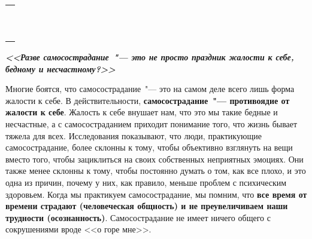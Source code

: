 \setlength{\extrarowheight}{2mm}
\begin{tabularx}{\textwidth}{X}
	\\
	\arrayrulecolor{gray}\hline\\
	\hline\\
	\hline\\
	\hline\\
	\hline\\
	\hline\\
	\hline\\
	\hline\\
	\hline\\
	\hline\\
	\hline\\	
\end{tabularx}
\setlength{\extrarowheight}{0mm}


\textbf{\textit{<<Разве самосострадание~"--- это не просто праздник жалости к себе, бедному и несчастному?>>}}

\vspace{2ex}

Многие боятся, что самосострадание~"--- это на самом деле всего лишь форма жалости к себе. В действительности,\textbf{ самосострадание~"--- противоядие от жалости к себе}. Жалость к себе внушает нам, что это мы такие бедные и несчастные, а с самосостраданием приходит понимание того, что жизнь бывает тяжела для всех. Исследования показывают, что люди, практикующие самосострадание, более склонны к тому, чтобы объективно взглянуть на вещи вместо того, чтобы зациклиться на своих собственных неприятных эмоциях. Они также менее склонны к тому, чтобы постоянно думать о том, как все плохо, и это одна из причин, почему у них, как правило, меньше проблем с психическим здоровьем. Когда мы практикуем самосострадание, мы помним, что \textbf{все время от времени страдают (человеческая общность) и не преувеличиваем наши трудности (осознанность)}. Самосострадание не имеет ничего общего с сокрушениями вроде <<о горе мне>>. 

